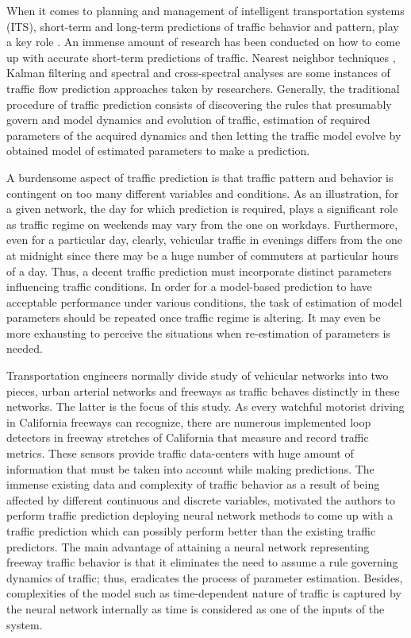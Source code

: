 \documentclass[twocolumn,10pt]{asme2e}
\begin{document}
When it comes to planning and management of intelligent transportation systems (ITS), short-term and long-term predictions of traffic behavior and pattern, play a key role \cite{TrafficPrediction}. An immense amount of research has been conducted on how to come up with accurate short-term predictions of traffic. Nearest neighbor techniques \cite{nearestNeighbor}, Kalman filtering \cite{Kalman} and spectral and cross-spectral analyses \cite{spectral} are some instances of traffic flow prediction approaches taken by researchers. Generally, the traditional procedure of traffic prediction consists of discovering the rules that presumably govern and model dynamics and evolution of traffic, estimation of required parameters of the acquired dynamics and then letting the traffic model evolve by obtained model of estimated parameters to make a prediction.   

A burdensome aspect of traffic prediction is that traffic pattern and behavior is contingent on too many different variables and conditions. As an illustration, for a given network, the day for which prediction is required, plays a significant role as traffic regime on weekends may vary from the one on workdays. Furthermore, even for a particular day, clearly, vehicular traffic in evenings differs from the one at midnight since there may be a huge number of commuters at particular hours of a day. Thus, a decent traffic prediction must incorporate distinct parameters influencing traffic conditions. In order for a model-based prediction to have acceptable performance under various conditions, the task of estimation of model parameters should be repeated once traffic regime is altering. It may even be more exhausting to perceive the situations when re-estimation of parameters is needed. 

Transportation engineers normally divide study of vehicular networks into two pieces, urban arterial networks and freeways as traffic behaves distinctly in these networks. The latter is the focus of this study. 
As every watchful motorist driving in California freeways can recognize, there are numerous implemented loop detectors in freeway stretches of California that measure and record traffic metrics. These sensors provide traffic data-centers with huge amount of information that must be taken into account while making predictions. The immense existing data and complexity of traffic behavior as a result of being affected by different continuous and discrete variables, motivated the authors to perform traffic prediction deploying neural network methods to come up with a traffic prediction which can possibly perform better than the existing traffic predictors\cite{NNreview}. The main advantage of attaining a neural network representing freeway traffic behavior is that it eliminates the need to assume a rule governing dynamics of traffic; thus, eradicates the process of parameter estimation. Besides, complexities of the model such as time-dependent nature of traffic is captured by the neural network internally as time is considered as one of the inputs of the system. 
\end{document}
